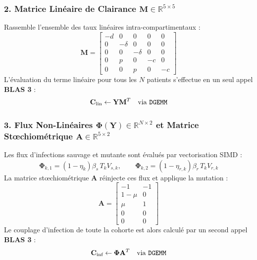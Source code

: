 \documentclass[11pt,a4paper]{report}
\theoremstyle{plain}
\theoremstyle{definition}
\theoremstyle{remark}
\begin{document}
\subsubsection{2. Matrice Linéaire de Clairance $\mathbf{M} \in \mathbb{R}^{5 \times 5}$}
Rassemble l'ensemble des taux linéaires intra-compartimentaux :
\begin{equation}
\mathbf{M} = \begin{bmatrix}
-d & 0 & 0 & 0 & 0 \\
0 & -\delta & 0 & 0 & 0 \\
0 & 0 & -\delta & 0 & 0 \\
0 & p & 0 & -c & 0 \\
0 & 0 & p & 0 & -c
\end{bmatrix}
\end{equation}
L'évaluation du terme linéaire pour tous les $N$ patients s'effectue en un seul appel \textbf{BLAS 3} :
\begin{equation}
\mathbf{C}_{\text{lin}} \leftarrow \mathbf{Y} \mathbf{M}^T \quad \text{via \texttt{DGEMM}}
\end{equation}

\subsubsection{3. Flux Non-Linéaires $\mathbf{\Phi}(\mathbf{Y}) \in \mathbb{R}^{N \times 2}$ et Matrice Stœchiométrique $\mathbf{A} \in \mathbb{R}^{5 \times 2}$}
Les flux d'infections sauvage et mutante sont évalués par vectorisation SIMD :
\begin{equation}
\mathbf{\Phi}_{k, 1} = (1 - \eta_k) \beta_s \, T_k V_{s,k}, \qquad \mathbf{\Phi}_{k, 2} = (1 - \eta_{r,k}) \beta_r \, T_k V_{r,k}
\end{equation}
La matrice stœchiométrique $\mathbf{A}$ réinjecte ces flux et applique la mutation :
\begin{equation}
\mathbf{A} = \begin{bmatrix}
-1 & -1 \\
1 - \mu & 0 \\
\mu & 1 \\
0 & 0 \\
0 & 0
\end{bmatrix}
\end{equation}
Le couplage d'infection de toute la cohorte est alors calculé par un second appel \textbf{BLAS 3} :
\begin{equation}
\mathbf{C}_{\text{inf}} \leftarrow \mathbf{\Phi} \mathbf{A}^T \quad \text{via \texttt{DGEMM}}
\end{equation}
\end{document}
